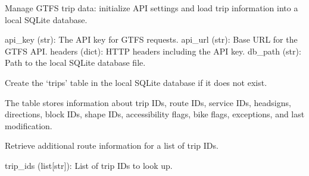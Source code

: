 \documentclass[letterpaper,10pt,english]{sphinxmanual}
\begin{document}
\begin{fulllineitems}
\label{\detokenize{api:managers.trip_manager.TripManager}}
\pysigstartsignatures
{}
\pysigstopsignatures
\sphinxAtStartPar
Manage GTFS trip data: initialize API settings and load trip information into a local SQLite database.
\begin{description}
\sphinxAtStartPar
api\_key (str): The API key for GTFS requests.
api\_url (str): Base URL for the GTFS API.
headers (dict): HTTP headers including the API key.
db\_path (str): Path to the local SQLite database file.

\end{description}

\begin{fulllineitems}
\label{\detokenize{api:managers.trip_manager.TripManager.create_trip_table}}
\pysigstartsignatures
{}
\pysigstopsignatures
\sphinxAtStartPar
Create the ‘trips’ table in the local SQLite database if it does not exist.

\sphinxAtStartPar
The table stores information about trip IDs, route IDs, service IDs, headsigns,
directions, block IDs, shape IDs, accessibility flags, bike flags, exceptions, and last modification.

\end{fulllineitems}


\begin{fulllineitems}
\label{\detokenize{api:managers.trip_manager.TripManager.get_infos_by_trip_id}}
\pysigstartsignatures
{}
\pysigstopsignatures
\sphinxAtStartPar
Retrieve additional route information for a list of trip IDs.
\begin{description}
\sphinxAtStartPar
trip\_ids (list{[}str{]}): List of trip IDs to look up.


\end{description}
\end{fulllineitems}
\end{fulllineitems}
\end{document}
